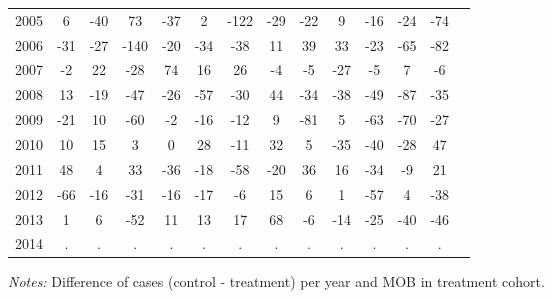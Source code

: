 \begin{table}[H]
\begin{threeparttable}
{\begin{tabular}{l*{13}{c}}
2005        &           6&         -40&          73&         -37&           2&        -122&         -29&         -22&           9&         -16&         -24&         -74\\
2006        &         -31&         -27&        -140&         -20&         -34&         -38&          11&          39&          33&         -23&         -65&         -82\\
2007        &          -2&          22&         -28&          74&          16&          26&          -4&          -5&         -27&          -5&           7&          -6\\
2008        &          13&         -19&         -47&         -26&         -57&         -30&          44&         -34&         -38&         -49&         -87&         -35\\
2009        &         -21&          10&         -60&          -2&         -16&         -12&           9&         -81&           5&         -63&         -70&         -27\\
2010        &          10&          15&           3&           0&          28&         -11&          32&           5&         -35&         -40&         -28&          47\\
2011        &          48&           4&          33&         -36&         -18&         -58&         -20&          36&          16&         -34&          -9&          21\\
2012        &         -66&         -16&         -31&         -16&         -17&          -6&          15&           6&           1&         -57&           4&         -38\\
2013        &           1&           6&         -52&          11&          13&          17&          68&          -6&         -14&         -25&         -40&         -46\\
2014        &           .&           .&           .&           .&           .&           .&           .&           .&           .&           .&           .&           .\\
 \bottomrule \end{tabular} } \begin{tablenotes} \item \scriptsize \emph{Notes:} Difference of cases (control - treatment) per year and MOB in treatment cohort. \end{tablenotes} \end{threeparttable} \end{table} 
